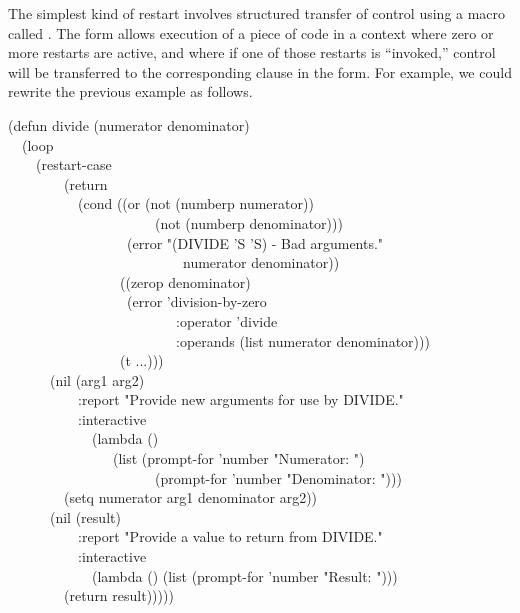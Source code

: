 The simplest kind of restart involves structured transfer of control using
a macro called . The  form allows execution of
a piece of code in a context where zero or more restarts are active, and
where if one of those restarts is ``invoked,'' control will be transferred
to the corresponding clause in the  form. For example, we could
rewrite the previous  example as follows.
\begin{lisp}
(defun divide (numerator denominator) \\
~~(loop \\
~~~~(restart-case \\
~~~~~~~~(return \\
~~~~~~~~~~(cond ((or (not (numberp numerator)) \\
~~~~~~~~~~~~~~~~~~~~~(not (numberp denominator))) \\
~~~~~~~~~~~~~~~~~(error "(DIVIDE '{\Xtilde}S '{\Xtilde}S) - Bad arguments." \\
~~~~~~~~~~~~~~~~~~~~~~~~~numerator denominator)) \\
~~~~~~~~~~~~~~~~((zerop denominator) \\
~~~~~~~~~~~~~~~~~(error 'division-by-zero \\
~~~~~~~~~~~~~~~~~~~~~~~~:operator 'divide \\
~~~~~~~~~~~~~~~~~~~~~~~~:operands (list numerator denominator))) \\
~~~~~~~~~~~~~~~~(t ...))) \\
~~~~~~(nil (arg1 arg2) \\
~~~~~~~~~~:report "Provide new arguments for use by DIVIDE." \\
~~~~~~~~~~:interactive \\
~~~~~~~~~~~~(lambda () \\
~~~~~~~~~~~~~~~(list (prompt-for 'number "Numerator: ") \\
~~~~~~~~~~~~~~~~~~~~~(prompt-for 'number "Denominator: "))) \\
~~~~~~~~(setq numerator arg1 denominator arg2)) \\
~~~~~~(nil (result) \\
~~~~~~~~~~:report "Provide a value to return from DIVIDE." \\
~~~~~~~~~~:interactive \\
~~~~~~~~~~~~(lambda () (list (prompt-for 'number "Result: "))) \\
~~~~~~~~(return result)))))
\end{lisp}

